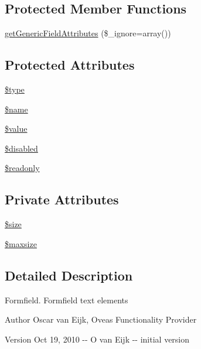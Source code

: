 \subsection*{Protected Member Functions}
\begin{DoxyCompactItemize}
\item 
\hyperlink{classFormField_a9f9d136ba8b4a793f22370aff43d592d}{getGenericFieldAttributes} (\$\_\-ignore=array())
\end{DoxyCompactItemize}
\subsection*{Protected Attributes}
\begin{DoxyCompactItemize}
\item 
\hyperlink{classFormField_a37bed21a1891e95be0e4a697e45ba51b}{\$type}
\item 
\hyperlink{classFormField_a23861f707bcd77bbace6300de9621746}{\$name}
\item 
\hyperlink{classFormField_a3c01e89834248eec8e2f145fbcfa0fbc}{\$value}
\item 
\hyperlink{classFormField_ab6f1907061890290e32cb2befc0a5f50}{\$disabled}
\item 
\hyperlink{classFormField_a78ba5d4b9127e75e8ccf86f397b5d9ac}{\$readonly}
\end{DoxyCompactItemize}
\subsection*{Private Attributes}
\begin{DoxyCompactItemize}
\item 
\hyperlink{classFormFieldText_a1db9cf2b51d60717eab0d295e97bcd5b}{\$size}
\item 
\hyperlink{classFormFieldText_ac984f8586351de82eb4a461f053d5329}{\$maxsize}
\end{DoxyCompactItemize}


\subsection{Detailed Description}
Formfield. Formfield text elements \begin{DoxyAuthor}{Author}
Oscar van Eijk, Oveas Functionality Provider 
\end{DoxyAuthor}
\begin{DoxyVersion}{Version}
Oct 19, 2010 -\/-\/ O van Eijk -\/-\/ initial version 
\end{DoxyVersion}


